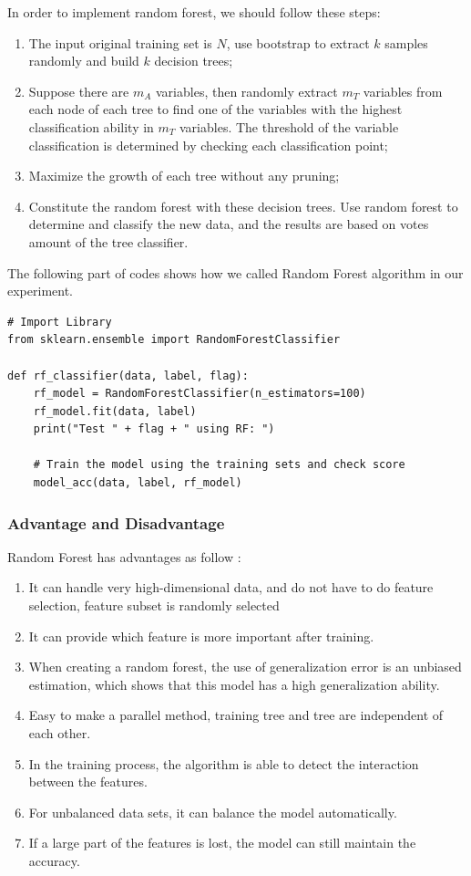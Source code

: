 \documentclass[sigconf]{acmart}
\begin{document}
In order to implement random forest, we should follow these steps:
\begin{enumerate}
    \item The input original training set is $N$, use bootstrap to extract $k$ samples randomly and build $k$ decision trees;
    \item Suppose there are $m_{A}$ variables, then randomly extract $m_{T}$ variables from each node of each tree to find one of the variables with the highest classification ability in $m_{T}$ variables. The threshold of the variable classification is determined by checking each classification point;
    \item Maximize the growth of each tree without any pruning;
    \item Constitute the random forest with these decision trees. Use random forest to determine and classify the new data, and the results are based on votes amount of the tree classifier.
\end{enumerate}

The following part of codes shows how we called Random Forest algorithm in our experiment.
\begin{lstlisting}
# Import Library
from sklearn.ensemble import RandomForestClassifier

def rf_classifier(data, label, flag):
    rf_model = RandomForestClassifier(n_estimators=100)
    rf_model.fit(data, label)
    print("Test " + flag + " using RF: ")
    
    # Train the model using the training sets and check score
    model_acc(data, label, rf_model)
\end{lstlisting}

\subsubsection{Advantage and Disadvantage}

Random Forest has advantages as follow \cite{RF}:
\begin{enumerate}
    \item It can handle very high-dimensional data, and do not have to do feature selection, feature subset is randomly selected
    \item It can provide which feature is more important after training.
    \item When creating a random forest, the use of generalization error is an unbiased estimation, which shows that this model has a high generalization ability.
    \item Easy to make a parallel method, training tree and tree are independent of each other.
    \item In the training process, the algorithm is able to detect the interaction between the features.
    \item For unbalanced data sets, it can balance the model automatically.
    \item If a large part of the features is lost, the model can still maintain the accuracy.
\end{enumerate}
\end{document}
